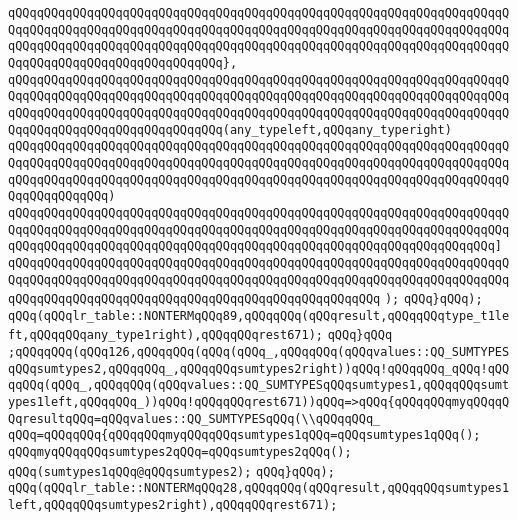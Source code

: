 \verb|qQQqqQQqqQQqqQQqqQQqqQQqqQQqqQQqqQQqqQQqqQQqqQQqqQQqqQQqqQQqqQQqqQQqqQQqqQQqqQQqqQQqqQQqqQQqqQQqqQQqqQQqqQQqqQQqqQQqqQQqqQQqqQQqqQQqqQQqqQQqqQQqqQQqqQQqqQQqqQQqqQQqqQQqqQQqqQQqqQQqqQQqqQQqqQQqqQQqqQQqqQQqqQQqqQQqqQQqqQQqqQQqqQQqqQQqqQQqqQQq},|\newline
\verb|qQQqqQQqqQQqqQQqqQQqqQQqqQQqqQQqqQQqqQQqqQQqqQQqqQQqqQQqqQQqqQQqqQQqqQQqqQQqqQQqqQQqqQQqqQQqqQQqqQQqqQQqqQQqqQQqqQQqqQQqqQQqqQQqqQQqqQQqqQQqqQQqqQQqqQQqqQQqqQQqqQQqqQQqqQQqqQQqqQQqqQQqqQQqqQQqqQQqqQQqqQQqqQQqqQQqqQQqqQQqqQQqqQQqqQQqqQQqqQQq(any_typeleft,qQQqany_typeright)|\newline
\verb|qQQqqQQqqQQqqQQqqQQqqQQqqQQqqQQqqQQqqQQqqQQqqQQqqQQqqQQqqQQqqQQqqQQqqQQqqQQqqQQqqQQqqQQqqQQqqQQqqQQqqQQqqQQqqQQqqQQqqQQqqQQqqQQqqQQqqQQqqQQqqQQqqQQqqQQqqQQqqQQqqQQqqQQqqQQqqQQqqQQqqQQqqQQqqQQqqQQqqQQqqQQqqQQqqQQqqQQqqQQqqQQq)|\newline
\verb|qQQqqQQqqQQqqQQqqQQqqQQqqQQqqQQqqQQqqQQqqQQqqQQqqQQqqQQqqQQqqQQqqQQqqQQqqQQqqQQqqQQqqQQqqQQqqQQqqQQqqQQqqQQqqQQqqQQqqQQqqQQqqQQqqQQqqQQqqQQqqQQqqQQqqQQqqQQqqQQqqQQqqQQqqQQqqQQqqQQqqQQqqQQqqQQqqQQqqQQqqQQqqQQq]|\newline
\verb|qQQqqQQqqQQqqQQqqQQqqQQqqQQqqQQqqQQqqQQqqQQqqQQqqQQqqQQqqQQqqQQqqQQqqQQqqQQqqQQqqQQqqQQqqQQqqQQqqQQqqQQqqQQqqQQqqQQqqQQqqQQqqQQqqQQqqQQqqQQqqQQqqQQqqQQqqQQqqQQqqQQqqQQqqQQqqQQqqQQqqQQqqQQqqQQq|\newline
\verb|);|\newline
\verb|qQQq}qQQq);|\newline
\verb|qQQq(qQQqlr_table::NONTERMqQQq89,qQQqqQQq(qQQqresult,qQQqqQQqtype_t1left,qQQqqQQqany_type1right),qQQqqQQqrest671);|\newline
\verb|qQQq}qQQq|\newline
\verb|;qQQqqQQq(qQQq126,qQQqqQQq(qQQq(qQQq_,qQQqqQQq(qQQqvalues::QQ_SUMTYPESqQQqsumtypes2,qQQqqQQq_,qQQqqQQqsumtypes2right))qQQq!qQQqqQQq_qQQq!qQQqqQQq(qQQq_,qQQqqQQq(qQQqvalues::QQ_SUMTYPESqQQqsumtypes1,qQQqqQQqsumtypes1left,qQQqqQQq_))qQQq!qQQqqQQqrest671))qQQq=>qQQq{qQQqqQQqmyqQQqqQQqresultqQQq=qQQqvalues::QQ_SUMTYPESqQQq(\\qQQqqQQq_|\newline
\verb|qQQq=qQQqqQQq{qQQqqQQqmyqQQqqQQqsumtypes1qQQq=qQQqsumtypes1qQQq();|\newline
\verb|qQQqmyqQQqqQQqsumtypes2qQQq=qQQqsumtypes2qQQq();|\newline
\verb|qQQq(sumtypes1qQQq@qQQqsumtypes2);|\newline
\verb|qQQq}qQQq);|\newline
\verb|qQQq(qQQqlr_table::NONTERMqQQq28,qQQqqQQq(qQQqresult,qQQqqQQqsumtypes1left,qQQqqQQqsumtypes2right),qQQqqQQqrest671);|\newline
